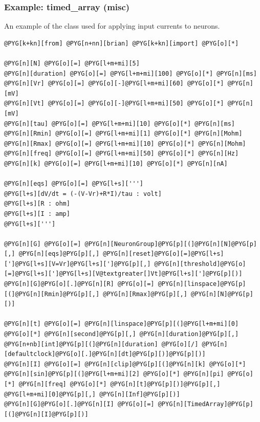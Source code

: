 \documentclass[letterpaper,10pt,english]{manual}
\begin{document}
\resetcurrentobjects
\hypertarget{--doc-examples-misc_timed_array}{}

\hypertarget{index-68}{}\subsubsection{Example: timed\_array (misc)}

An example of the \hyperlink{brian.TimedArray}{} class used for applying input currents
to neurons.

\begin{Verbatim}[commandchars=@\[\]]
@PYG[k+kn][from] @PYG[n+nn][brian] @PYG[k+kn][import] @PYG[o][*]

@PYG[n][N] @PYG[o][=] @PYG[l+m+mi][5]
@PYG[n][duration] @PYG[o][=] @PYG[l+m+mi][100] @PYG[o][*] @PYG[n][ms]
@PYG[n][Vr] @PYG[o][=] @PYG[o][-]@PYG[l+m+mi][60] @PYG[o][*] @PYG[n][mV]
@PYG[n][Vt] @PYG[o][=] @PYG[o][-]@PYG[l+m+mi][50] @PYG[o][*] @PYG[n][mV]
@PYG[n][tau] @PYG[o][=] @PYG[l+m+mi][10] @PYG[o][*] @PYG[n][ms]
@PYG[n][Rmin] @PYG[o][=] @PYG[l+m+mi][1] @PYG[o][*] @PYG[n][Mohm]
@PYG[n][Rmax] @PYG[o][=] @PYG[l+m+mi][10] @PYG[o][*] @PYG[n][Mohm]
@PYG[n][freq] @PYG[o][=] @PYG[l+m+mi][50] @PYG[o][*] @PYG[n][Hz]
@PYG[n][k] @PYG[o][=] @PYG[l+m+mi][10] @PYG[o][*] @PYG[n][nA]

@PYG[n][eqs] @PYG[o][=] @PYG[l+s][''']
@PYG[l+s][dV/dt = (-(V-Vr)+R*I)/tau : volt]
@PYG[l+s][R : ohm]
@PYG[l+s][I : amp]
@PYG[l+s][''']

@PYG[n][G] @PYG[o][=] @PYG[n][NeuronGroup]@PYG[p][(]@PYG[n][N]@PYG[p][,] @PYG[n][eqs]@PYG[p][,] @PYG[n][reset]@PYG[o][=]@PYG[l+s][']@PYG[l+s][V=Vr]@PYG[l+s][']@PYG[p][,] @PYG[n][threshold]@PYG[o][=]@PYG[l+s][']@PYG[l+s][V@textgreater[]Vt]@PYG[l+s][']@PYG[p][)]
@PYG[n][G]@PYG[o][.]@PYG[n][R] @PYG[o][=] @PYG[n][linspace]@PYG[p][(]@PYG[n][Rmin]@PYG[p][,] @PYG[n][Rmax]@PYG[p][,] @PYG[n][N]@PYG[p][)]

@PYG[n][t] @PYG[o][=] @PYG[n][linspace]@PYG[p][(]@PYG[l+m+mi][0] @PYG[o][*] @PYG[n][second]@PYG[p][,] @PYG[n][duration]@PYG[p][,] @PYG[n+nb][int]@PYG[p][(]@PYG[n][duration] @PYG[o][/] @PYG[n][defaultclock]@PYG[o][.]@PYG[n][dt]@PYG[p][)]@PYG[p][)]
@PYG[n][I] @PYG[o][=] @PYG[n][clip]@PYG[p][(]@PYG[n][k] @PYG[o][*] @PYG[n][sin]@PYG[p][(]@PYG[l+m+mi][2] @PYG[o][*] @PYG[n][pi] @PYG[o][*] @PYG[n][freq] @PYG[o][*] @PYG[n][t]@PYG[p][)]@PYG[p][,] @PYG[l+m+mi][0]@PYG[p][,] @PYG[n][Inf]@PYG[p][)]
@PYG[n][G]@PYG[o][.]@PYG[n][I] @PYG[o][=] @PYG[n][TimedArray]@PYG[p][(]@PYG[n][I]@PYG[p][)]


\end{Verbatim}
\end{document}
